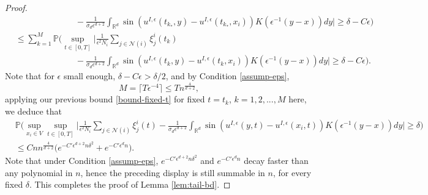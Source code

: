 \documentclass[a4paper,11pt]{amsart}
\newcommand{\red}[1]{{#1}}
\renewcommand{\P}{\mathbb{P}}
\newcommand{\ep}{\epsilon}
\newcommand{\cN}{\mathcal{N}}
\numberwithin{equation}{section}
\numberwithin{theorem}{section}
\theoremstyle{definition}
\begin{document}
\begin{proof}
\begin{align*}
&\quad\quad\quad\quad\quad\quad\quad-\frac{1}{\sigma_d\ep^{d+2}}\int_{\red{\mathbb{R}^d}} \sin\left(u^{I,\ep}(t_{k_*},y)-u^{I,\ep}(t_{k_*},x_i)\right)K\left(\ep^{-1}(y-x)\right)dy \Big|\ge \delta-C\ep\Big)\\
&\le \sum_{k=1}^M\P\Big(\sup_{t\in[0,T]}\Big|\frac{1}{\ep^2N_i}\sum_{j\in\cN(i)}\xi_j^i(t_k)\\
&\quad\quad\quad\quad\quad\quad\quad-\frac{1}{\sigma_d\ep^{d+2}}\int_{\mathbb{R}^d} \sin\left(u^{I,\ep}(t_k,y)-u^{I,\ep}(t_k,x_i)\right)K\left(\ep^{-1}(y-x)\right)dy \Big|\ge \delta-C\ep\Big).
\end{align*}
Note that for $\ep$ small enough, $\delta-C\ep>\delta/2$, and by Condition \ref{assump-eps},
\[
M=\lceil T \ep^{-4}\rceil\le Tn^{\frac{4}{d+2}},
\]
applying our previous bound \eqref{bound-fixed-t} for fixed $t=t_k$, $k=1,2,...,M$ here, we deduce that 
\begin{align*}
&\P\Big(\sup_{x_i\in V}\sup_{t\in[0,T]}\Big|\frac{1}{\ep^2N_i}\sum_{j\in\cN(i)}\xi_j^i(t) -\frac{1}{\sigma_d\ep^{d+2}}\int_{\red{\mathbb{R}^d}} \sin\left(u^{I,\ep}(y,t)-u^{I,\ep}(x_i,t)\right)K\left(\ep^{-1}(y-x)\right)dy \Big|\ge \delta\Big)\\
&\le Cnn^{\frac{4}{d+2}}\big(e^{-C'\ep^{d+2} n \delta^2}+e^{-C'\ep^dn}\big).
\end{align*}
Note that under Condition \ref{assump-eps}, $e^{-C'\ep^{d+2} n \delta^2}$ and $e^{-C'\ep^dn}$ decay faster than any polynomial in $n$, hence the preceding display is still summable in $n$, for every fixed $\delta$. This completes the proof of Lemma \ref{lem:tail-bd}.
\end{proof}
\end{document}
